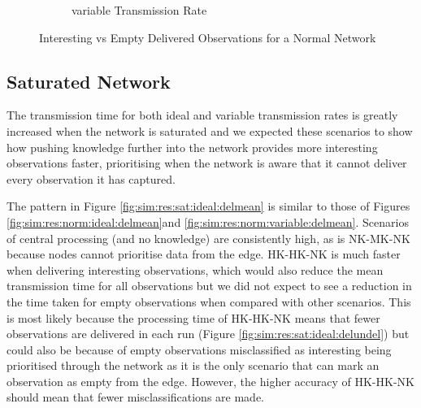 \begin{figure}[H]
\begin{subfigure}{.5\textwidth}
  \caption{variable Transmission Rate}
	\label{fig:sim:res:norm:variable:emptint}
\end{subfigure}
\caption{Interesting vs Empty Delivered Observations for a Normal Network}
\end{figure}

\subsection{Saturated Network}
The transmission time for both ideal and variable transmission rates is greatly increased when the network is saturated and we expected these scenarios to show how pushing knowledge further into the network provides more interesting observations faster, prioritising when the network is aware that it cannot deliver every observation it has captured.

	The pattern in Figure \ref{fig:sim:res:sat:ideal:delmean} is similar to those of Figures \ref{fig:sim:res:norm:ideal:delmean}and \ref{fig:sim:res:norm:variable:delmean}. Scenarios of central processing (and no knowledge) are consistently high, as is NK-MK-NK because nodes cannot prioritise data from the edge. HK-HK-NK is much faster when delivering interesting observations, which would also reduce the mean transmission time for all observations but we did not expect to see a reduction in the time taken for empty observations when compared with other scenarios. This is most likely because the processing time of HK-HK-NK means that fewer observations are delivered in each run (Figure \ref{fig:sim:res:sat:ideal:delundel}) but could also be because of empty observations misclassified as interesting being prioritised through the network as it is the only scenario that can mark an observation as empty from the edge. However, the higher accuracy of HK-HK-NK should mean that fewer misclassifications are made. 
	
